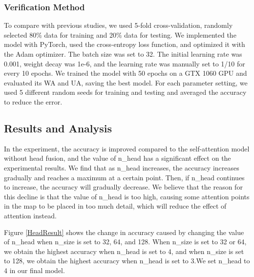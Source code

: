 \documentclass[10pt, conference, compsocconf]{IEEEtran}
\begin{document}
\subsubsection{Verification Method}
To compare with previous studies, we used 5-fold cross-validation, randomly selected 80\% data for training and 20\% data for testing. We implemented the model with PyTorch, used the cross-entropy loss function, and optimized it with the Adam optimizer. The batch size was set to 32. The initial learning rate was 0.001, weight decay was 1e-6, and the learning rate was manually set to 1/10 for every 10 epochs. We trained the model with 50 epochs on a GTX 1060 GPU and evaluated its WA and UA, saving the best model. For each parameter setting, we used 5 different random seeds for training and testing and averaged the accuracy to reduce the error.

\subsection{Results and Analysis}
In the experiment, the accuracy is improved compared to the self-attention model without head fusion, and the value of n\_head has a significant effect on the experimental results. We find that as n\_head increases, the accuracy increases gradually and reaches a maximum at a certain point. Then, if n\_head continues to increase, the accuracy will gradually decrease. We believe that the reason for this decline is that the value of n\_head is too high, causing some attention points in the map to be placed in too much detail, which will reduce the effect of attention instead.

Figure \ref{HeadResult} shows the change in accuracy caused by changing the value of n\_head when n\_size is set to 32, 64, and 128.
When n\_size is set to 32 or 64, we obtain the highest accuracy when n\_head is set to 4, and when n\_size is set to 128, we obtain the highest accuracy when n\_head is set to 3.We set n\_head to 4 in our final model.
\end{document}

